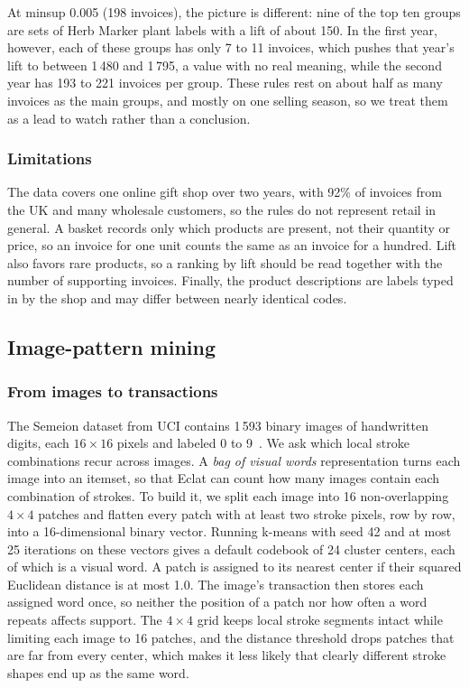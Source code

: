 At minsup 0.005 (198 invoices), the picture is different: nine of the top ten groups are
sets of Herb Marker plant labels with a lift of about 150. In the first year, however,
each of these groups has only 7 to 11 invoices, which pushes that year's lift to between
1\,480 and 1\,795, a value with no real meaning, while the second year has 193 to 221
invoices per group. These rules rest on about half as many invoices as the main groups,
and mostly on one selling season, so we treat them as a lead to watch rather than a
conclusion.

\subsubsection{Limitations}
The data covers one online gift shop over two years, with 92\% of invoices from the UK
and many wholesale customers, so the rules do not represent retail in general. A basket
records only which products are present, not their quantity or price, so an invoice for
one unit counts the same as an invoice for a hundred. Lift also favors rare products, so a
ranking by lift should be read together with the number of supporting invoices. Finally,
the product descriptions are labels typed in by the shop and may differ between nearly
identical codes.

\subsection{Image-pattern mining}
\label{sec:visual-patterns}
\subsubsection{From images to transactions}
The Semeion dataset from UCI contains 1\,593 binary images of handwritten digits, each
$16\times16$ pixels and labeled 0 to 9~\cite{semeionUCI}. We ask which local stroke
combinations recur across images. A \emph{bag of visual words} representation turns each
image into an itemset, so that Eclat can count how many images contain each combination of
strokes. To build it, we split each image into 16 non-overlapping $4\times4$ patches and
flatten every patch with at least two stroke pixels, row by row, into a 16-dimensional
binary vector. Running k-means with seed 42 and at most 25 iterations on these vectors
gives a default codebook of 24 cluster centers, each of which is a visual word. A patch is
assigned to its nearest center if their squared Euclidean distance is at most 1.0. The
image's transaction then stores each assigned word once, so neither the position of a
patch nor how often a word repeats affects support. The $4\times4$ grid keeps local stroke
segments intact while limiting each image to 16 patches, and the distance threshold drops
patches that are far from every center, which makes it less likely that clearly different
stroke shapes end up as the same word.

